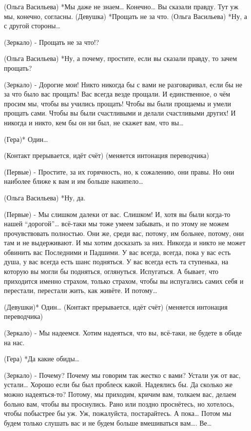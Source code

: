 (Ольга Васильева) *Мы даже не знаем… Конечно… Вы сказали правду. Тут уж мы, конечно, согласны.
(Девушка) *Прощать не за что.
(Ольга Васильева) *Ну, а с другой стороны…

(Зеркало) - Прощать не за что!? 

(Ольга Васильева) *Ну, а почему, простите, если вы сказали правду, то зачем прощать?

(Зеркало)  - Дорогие мои! Никто никогда бы с вами не разговаривал, если бы не за что было вас прощать! Вас всегда везде прощали. И единственное, о чём просим мы, чтобы вы учились прощать! Чтобы вы были прощаемы и умели прощать сами. Чтобы вы были счастливыми и делали счастливыми других! И никогда и никто, кем бы он ни был, не скажет вам, что вы…

(Гера)* Один…


(Контакт прерывается, идёт счёт)
(меняется интонация переводчика)

(Первые) - Простите, за их горячность, но, к сожалению, они правы. Но они наиболее ближе к вам и им больше накипело…

(Ольга Васильева) *Ну, да.

(Первые) - Мы слишком далеки от вас. Слишком! И, хотя вы были когда-то нашей “дорогой”… всё-таки мы тоже умеем забывать, и по этому не можем прочувствовать полностью. Они же, среди вас, потому, им больнее, потому, они там и не выдерживают. И мы хотим досказать за них. Никогда и никто не может обвинить вас Последними и Падшими. У вас всегда, всегда, пока у вас есть душа, у вас всегда есть шанс подняться. У вас всегда есть та ступенька, на которую вы могли бы подняться, оглянуться. Испугаться. А бывает, что приходится именно страхом, только страхом, чтобы вы испугались самих себя и перестали, перестали жить, как живёте. И потому…

(Девушки)* Один…
(Контакт прерывается, идёт счёт)
(меняется интонация переводчика)

(Зеркало) - Мы надеемся. Хотим надеяться, что вы, всё-таки, не будете в обиде на нас. 

(Гера) *Да какие обиды…

(Зеркало) - Почему? Почему мы говорим так жестко с вами? Устали уж от вас, устали… Хорошо если бы был проблеск какой. Надеялись бы. Да сколько же можно надеяться-то? Потому, мы приходим, кричим вам, толкаем вас, делаем больно вам, чтобы вы проснулись. Рано или поздно проснётесь, но хотелось, чтобы побыстрее бы уж. Уж, пожалуйста, постарайтесь. А пока… Потом мы будем только слушать вас и не будем больше вмешиваться вам…. Ве…


